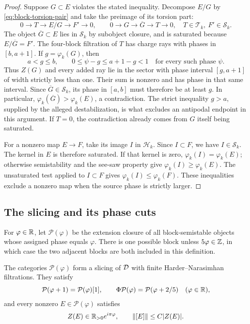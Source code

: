 \begin{proof}
Suppose $G\subset E$ violates the stated inequality.  Decompose $E/G$
by \eqref{eq:block-torsion-pair} and take the preimage of its torsion
part:
\[
 0\longrightarrow T\longrightarrow E/G\longrightarrow F'\longrightarrow0,
 \qquad
 0\longrightarrow G\longrightarrow\overline G\longrightarrow T
      \longrightarrow0,
 \quad T\in\mathcal T_k,\ F'\in\mathcal S_k.
\]
The object $\overline G\subset E$ lies in $\mathcal S_k$ by subobject
closure, and is saturated because $E/\overline G=F'$.
The four-block filtration of $T$ has charge rays with phases in
$[b,a+1]$.  If $g=\varphi_k(G)$, then
\[
 a<g\le b,
 \qquad 0\le\psi-g\le a+1-g<1
 \quad\text{for every such phase }\psi.
\]
Thus $Z(G)$ and every added ray lie in the sector with phase interval
$[g,a+1]$ of width strictly less than one.  Their sum is nonzero and has
phase in that same interval.  Since $\overline G\in\mathcal S_k$, its
phase in $[a,b]$ must therefore be at least $g$.  In particular,
$\varphi_k(\overline G)>\varphi_k(E)$, a contradiction.
The strict inequality $g>a$, supplied by the alleged destabilization,
is what excludes an antipodal endpoint in this argument.  If $T=0$, the
contradiction already comes from $G$ itself being saturated.

For a nonzero map $E\to F$, take its image $I$ in $\mathcal H_k$.
Since $I\subset F$, we have $I\in\mathcal S_k$.  The kernel in $E$ is
therefore saturated.  If that kernel is zero, $\varphi_k(I)=\varphi_k(E)$;
otherwise semistability and the see-saw property give
$\varphi_k(I)\ge\varphi_k(E)$.  The unsaturated test applied to
$I\subset F$ gives $\varphi_k(I)\le\varphi_k(F)$.  These inequalities
exclude a nonzero map when the source phase is strictly larger.
\end{proof}

\subsection{The slicing and its phase cuts}

For $\varphi\in\mathbb R$, let $\mathcal P(\varphi)$ be the extension closure
of all block-semistable objects whose assigned phase equals $\varphi$.
There is one possible block unless $5\varphi\in\mathbb Z$, in which case the
two adjacent blocks are both included in this definition.

\begin{proposition}\label{prop:slicing}
The categories $\mathcal P(\varphi)$ form a slicing of $\mathcal D$ with finite
Harder--Narasimhan filtrations.  They satisfy
\begin{equation}\label{eq:slicing-covariance}
 \mathcal P(\varphi+1)=\mathcal P(\varphi)[1],\qquad
 \Phi\mathcal P(\varphi)=\mathcal P(\varphi+2/5)
 \quad(\varphi\in\mathbb R),
\end{equation}
and every nonzero $E\in\mathcal P(\varphi)$ satisfies
\begin{equation}\label{eq:semistable-support}
 Z(E)\in\mathbb R_{>0}e^{i\pi\varphi},\qquad
 \left\lVert[E]\right\rVert\le C|Z(E)|.
\end{equation}
\end{proposition}

